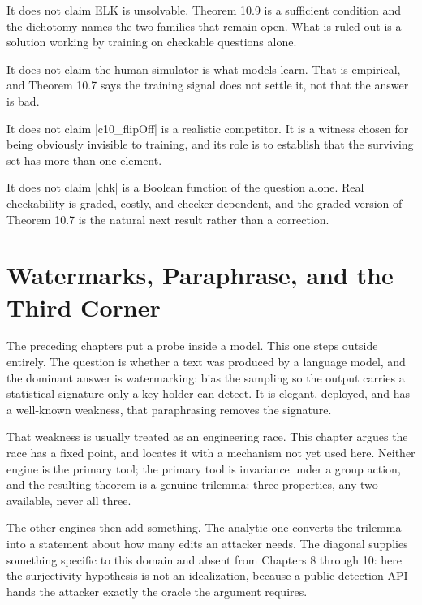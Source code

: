 \documentclass{memoir}
\begin{document}
It does not claim ELK is unsolvable. Theorem 10.9 is a sufficient condition and
the dichotomy names the two families that remain open. What is ruled out is a
solution working by training on checkable questions alone.

It does not claim the human simulator is what models learn. That is empirical,
and Theorem 10.7 says the training signal does not settle it, not that the
answer is bad.

It does not claim \LeanVerb|c10_flipOff| is a realistic competitor. It is a witness
chosen for being obviously invisible to training, and its role is to establish
that the surviving set has more than one element.

It does not claim \LeanVerb|chk| is a Boolean function of the question alone. Real
checkability is graded, costly, and checker-dependent, and the graded version of
Theorem 10.7 is the natural next result rather than a correction.





\chapter{Watermarks, Paraphrase, and the Third Corner}\label{Two--Schemas--of--Impossibility-005F-005F-005F--Machine--Checked--Limits--of--Trustworthy--Machine--Learning-005F-005F-005F--and--Why--They--Tighten--with--Capability----Watermarks-005F-005F-005F--Paraphrase-005F-005F-005F--and--the--Third--Corner}

The preceding chapters put a probe inside a model. This one steps outside
entirely. The question is whether a text was produced by a language model, and
the dominant answer is watermarking: bias the sampling so the output carries a
statistical signature only a key-holder can detect. It is elegant, deployed, and
has a well-known weakness, that paraphrasing removes the signature.

That weakness is usually treated as an engineering race. This chapter argues the
race has a fixed point, and locates it with a mechanism not yet used here.
Neither engine is the primary tool; the primary tool is invariance under a group
action, and the resulting theorem is a genuine trilemma: three properties, any
two available, never all three.

The other engines then add something. The analytic one converts the trilemma
into a statement about how many edits an attacker needs. The diagonal supplies
something specific to this domain and absent from Chapters 8 through 10: here
the surjectivity hypothesis is not an idealization, because a public detection
API hands the attacker exactly the oracle the argument requires.
\end{document}
